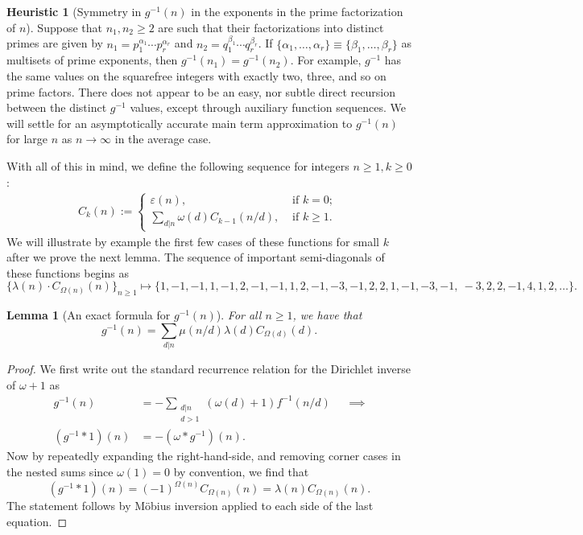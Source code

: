 \documentclass[11pt,reqno,a4letter]{article}
\numberwithin{figure}{section}
\numberwithin{table}{section}
\newcommand{\seqnum}[1]{\href{http://oeis.org/#1}{\color{ProcessBlue}{\underline{#1}}}}
\theoremstyle{plain}
\newtheorem{lemma}[theorem]{Lemma}
\numberwithin{theorem}{section}
\theoremstyle{definition}
\newtheorem{heuristic}[theorem]{Heuristic}
\begin{document}
\begin{heuristic}[Symmetry in $g^{-1}(n)$ in the exponents in the prime factorization of $n$] 
Suppose that $n_1, n_2 \geq 2$ are such that their factorizations into distinct primes are 
given by $n_1 = p_1^{\alpha_1} \cdots p_r^{\alpha_r}$ and $n_2 = q_1^{\beta_1} \cdots q_r^{\beta_r}$. 
If $\{\alpha_1, \ldots, \alpha_r\} \equiv \{\beta_1, \ldots, \beta_r\}$ as multisets of prime exponents, 
then $g^{-1}(n_1) = g^{-1}(n_2)$. For example, $g^{-1}$ has the same values on the squarefree integers 
with exactly two, three, and so on prime factors. There does not appear to be an easy, nor subtle 
direct recursion between the distinct $g^{-1}$ values, except through auxiliary function sequences. 
We will settle for an asymptotically accurate main term approximation to $g^{-1}(n)$ for large $n$ as 
$n \rightarrow \infty$ in the average case. 
\end{heuristic} 

With all of this in mind, we define the following sequence for integers $n \geq 1, k \geq 0$: 
\begin{align} 
C_k(n) := \begin{cases} 
     \varepsilon(n), & \text{ if $k = 0$; } \\ 
     \sum\limits_{d|n} \omega(d) C_{k-1}(n/d), & \text{ if $k \geq 1$. } 
     \end{cases} 
\end{align} 
We will illustrate by example the first few cases of these functions for small $k$ after we prove 
the next lemma. 
The sequence of important semi-diagonals of these functions begins as 
\cite[\seqnum{A008480}]{OEIS} 
\[
\{\lambda(n) \cdot C_{\Omega(n)}(n) \}_{n \geq 1} \mapsto \{
     1, -1, -1, 1, -1, 2, -1, -1, 1, 2, -1, -3, -1, 2, 2, 1, -1, -3, -1, \
     -3, 2, 2, -1, 4, 1, 2, \ldots \}. 
\]

\begin{lemma}[An exact formula for $g^{-1}(n)$] 
\label{lemma_AnExactFormulaFor_gInvByMobiusInv_v1} 
For all $n \geq 1$, we have that 
\[
g^{-1}(n) = \sum_{d|n} \mu(n/d) \lambda(d) C_{\Omega(d)}(d). 
\]
\end{lemma}
\begin{proof} 
We first write out the standard recurrence relation for the Dirichlet inverse of 
$\omega+1$ as 
\begin{align*} 
g^{-1}(n) & = - \sum_{\substack{d|n \\ d>1}} (\omega(d) + 1) f^{-1}(n/d) && \implies \\ 
     (g^{-1} \ast 1)(n) & = -(\omega \ast g^{-1})(n). 
\end{align*} 
Now by repeatedly expanding the right-hand-side, and removing corner cases in the nested sums since 
$\omega(1) = 0$ by convention, we find that 
\[
(g^{-1} \ast 1)(n) = (-1)^{\Omega(n)} C_{\Omega(n)}(n) = \lambda(n) C_{\Omega(n)}(n). 
\]
The statement follows by M\"obius inversion applied to each side of the last equation. 
\end{proof}
\end{document}
